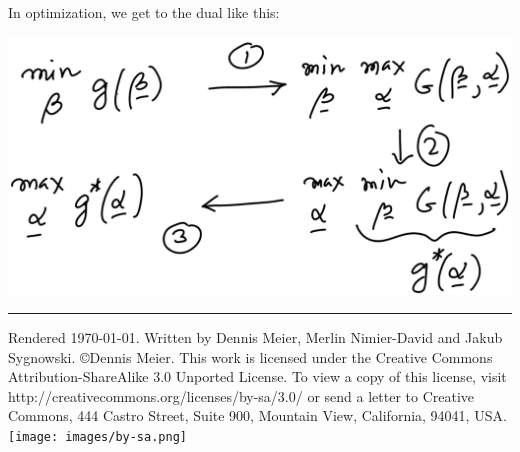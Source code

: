 \documentclass[10pt,a4paper,landscape]{article}
\begin{document}
\begin{multicols*}{4}
In optimization, we get to the dual like this:
\begin{colfig}
  \centering
  \includegraphics[width=\linewidth]{images/prim-dual.png}
\end{colfig}
\hrule
\tiny
Rendered \today. Written by Dennis Meier, Merlin Nimier-David and Jakub Sygnowski.
\copyright Dennis Meier. This work is licensed under the Creative Commons Attribution-ShareAlike 3.0 Unported License.
To view a copy of this license, visit http://creativecommons.org/licenses/by-sa/3.0/ or
send a letter to Creative Commons, 444 Castro Street, Suite 900, Mountain View, California, 94041, USA.
\texttt{[image: images/by-sa.png]}

\end{multicols*}
\end{document}

